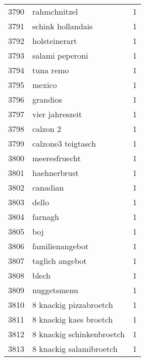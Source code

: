 \begin{tabular}{llr}
3790 &                                       rahmchnitzel &      1 \\
3791 &                                  schink hollandais &      1 \\
3792 &                                      holsteinerart &      1 \\
3793 &                                    salami peperoni &      1 \\
3794 &                                          tuna remo &      1 \\
3795 &                                             mexico &      1 \\
3796 &                                           grandios &      1 \\
3797 &                                    vier jahreszeit &      1 \\
3798 &                                           calzon 2 &      1 \\
3799 &                                 calzone3 teigtasch &      1 \\
3800 &                                      meeresfruecht &      1 \\
3801 &                                       haehnerbrust &      1 \\
3802 &                                           canadian &      1 \\
3803 &                                              dello &      1 \\
3804 &                                            farnagh &      1 \\
3805 &                                                boj &      1 \\
3806 &                                    familienangebot &      1 \\
3807 &                                    taglich angebot &      1 \\
3808 &                                              blech &      1 \\
3809 &                                        nuggetsmenu &      1 \\
3810 &                             8 knackig pizzabroetch &      1 \\
3811 &                             8 knackig kaes broetch &      1 \\
3812 &                          8 knackig schinkenbroetch &      1 \\
3813 &                            8 knackig salamibroetch &      1 \\

\end{tabular}
